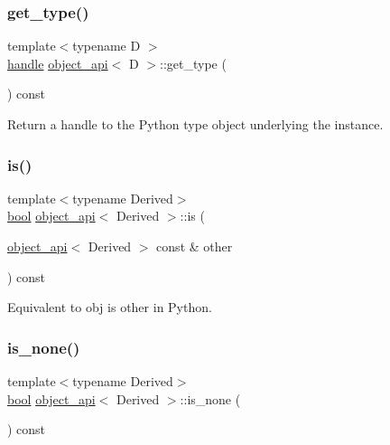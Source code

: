 \subsubsection{\texorpdfstring{get\_type()}{get\_type()}}
{\footnotesize\ttfamily template$<$typename D $>$ \\
\mbox{\hyperlink{classhandle}{handle}} \mbox{\hyperlink{classobject__api}{object\+\_\+api}}$<$ D $>$\+::get\+\_\+type (\begin{DoxyParamCaption}{ }\end{DoxyParamCaption}) const}



Return a handle to the Python type object underlying the instance. 

\mbox{\label{classobject__api_a63b93f9f16e8e08c9672fe553c054885}} 
\subsubsection{\texorpdfstring{is()}{is()}}
{\footnotesize\ttfamily template$<$typename Derived$>$ \\
\mbox{\hyperlink{asdl_8h_af6a258d8f3ee5206d682d799316314b1}{bool}} \mbox{\hyperlink{classobject__api}{object\+\_\+api}}$<$ Derived $>$\+::is (\begin{DoxyParamCaption}\item[{\mbox{\hyperlink{classobject__api}{object\+\_\+api}}$<$ Derived $>$ const \&}]{other }\end{DoxyParamCaption}) const\hspace{0.3cm}{\ttfamily [inline]}}



Equivalent to {\ttfamily obj is other} in Python. 

\mbox{\label{classobject__api_a29bb566d25e37a236a322267ef1c59eb}} 
\subsubsection{\texorpdfstring{is\_none()}{is\_none()}}
{\footnotesize\ttfamily template$<$typename Derived$>$ \\
\mbox{\hyperlink{asdl_8h_af6a258d8f3ee5206d682d799316314b1}{bool}} \mbox{\hyperlink{classobject__api}{object\+\_\+api}}$<$ Derived $>$\+::is\+\_\+none (\begin{DoxyParamCaption}{ }\end{DoxyParamCaption}) const\hspace{0.3cm}{\ttfamily [inline]}}



